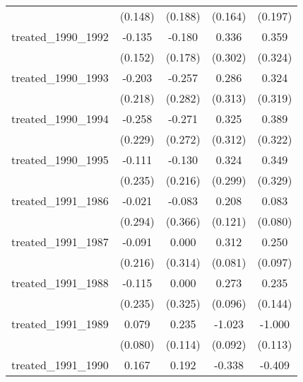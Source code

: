 {\begin{tabular}{l*{4}{c}}
            &     (0.148)         &     (0.188)         &     (0.164)         &     (0.197)         \\
[1em]
treated\_1990\_1992&      -0.135         &      -0.180         &       0.336         &       0.359         \\
            &     (0.152)         &     (0.178)         &     (0.302)         &     (0.324)         \\
[1em]
treated\_1990\_1993&      -0.203         &      -0.257         &       0.286         &       0.324         \\
            &     (0.218)         &     (0.282)         &     (0.313)         &     (0.319)         \\
[1em]
treated\_1990\_1994&      -0.258         &      -0.271         &       0.325         &       0.389         \\
            &     (0.229)         &     (0.272)         &     (0.312)         &     (0.322)         \\
[1em]
treated\_1990\_1995&      -0.111         &      -0.130         &       0.324         &       0.349         \\
            &     (0.235)         &     (0.216)         &     (0.299)         &     (0.329)         \\
[1em]
treated\_1991\_1986&      -0.021         &      -0.083         &       0.208         &       0.083         \\
            &     (0.294)         &     (0.366)         &     (0.121)         &     (0.080)         \\
[1em]
treated\_1991\_1987&      -0.091         &       0.000         &       0.312\sym{***}&       0.250\sym{**} \\
            &     (0.216)         &     (0.314)         &     (0.081)         &     (0.097)         \\
[1em]
treated\_1991\_1988&      -0.115         &       0.000         &       0.273\sym{**} &       0.235         \\
            &     (0.235)         &     (0.325)         &     (0.096)         &     (0.144)         \\
[1em]
treated\_1991\_1989&       0.079         &       0.235\sym{*}  &      -1.023\sym{***}&      -1.000\sym{***}\\
            &     (0.080)         &     (0.114)         &     (0.092)         &     (0.113)         \\
[1em]
treated\_1991\_1990&       0.167\sym{*}  &       0.192\sym{**} &      -0.338\sym{**} &      -0.409\sym{*}  \\

\end{tabular}}
